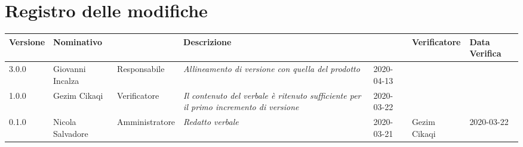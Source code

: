 \section*{Registro delle modifiche}
\renewcommand{\arraystretch}{1.8}

  \setlength\LTleft{-1.7cm}
  \begin{longtable}{|p{1.7cm}|p{2cm}|p{2.5cm}|p{3cm}|p{1.7cm}|p{2cm}|p{2.3cm}|}
    \hline

    \rowcolor{header}
    \textbf{Versione} & \textbf{Nominativo} & \centering{\textbf{Ruolo}} & \textbf{Descrizione} &      \centering{\textbf{Data}} & \textbf{Verificatore} & \textbf{Data Verifica} \\

    \hline
    3.0.0 & Giovanni Incalza & Responsabile & \small{\textit{Allineamento di versione con quella del prodotto}} & 2020-04-13 & &\\
    1.0.0 & Gezim Cikaqi & Verificatore & \small{\textit{Il contenuto del verbale è ritenuto sufficiente per il primo incremento di versione}} & 2020-03-22 & &\\
	0.1.0 & Nicola Salvadore & Amministratore & \small{\textit{Redatto verbale}} & 2020-03-21 & Gezim Cikaqi  & 2020-03-22\\
    \hline
  \end{longtable}
  \setlength\LTleft{0cm}
